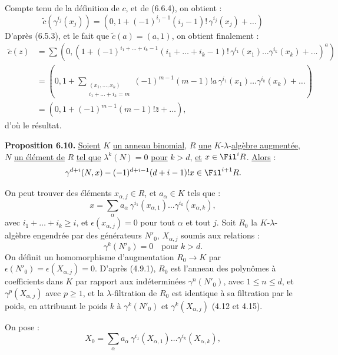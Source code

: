 
Compte tenu de la définition de \(c\), et de (6.6.4), on obtient :
\[
  \widetilde c(\gamma^{i_j}(x_j))
  =
  \left(0,1+(-1)^{i_j-1}(i_j-1)!\,\gamma^{i_j}(x_j)+\ldots\right)
\]
D'après (6.5.3), et le fait que \(\widetilde c(a)=(a,1)\), on obtient finalement :
\[
\begin{aligned}
\widetilde c(z)
&=\sum
\left(0,\left(1+
(-1)^{i_1+\ldots+i_k-1}
(i_1+\ldots+i_k-1)!
\,\gamma^{i_1}(x_1)\ldots\gamma^{i_k}(x_k)
+\ldots\right)^a\right)\\
&=
\left(0,1+
\sum_{\substack{(x_1,\ldots,x_k)\\ i_1+\ldots+i_k=m}}
(-1)^{m-1}(m-1)!a\,\gamma^{i_1}(x_1)\ldots\gamma^{i_k}(x_k)
+\ldots\right)\\
&=
(0,1+(-1)^{m-1}(m-1)!\bar z+\ldots),
\end{aligned}
\]
d'où le résultat.

\textbf{Proposition 6.10.} \uline{Soient} \(K\) \uline{un anneau binomial}, \(R\) \uline{une} \(K\)-\(\lambda\)-\uline{algèbre augmentée}, \(N\) \uline{un élément de} \(R\) \uline{tel que} \(\lambda^k(N)=0\) \uline{pour} \(k>d\), \uline{et} \(x\in\Fil^iR\). \uline{Alors} :
\[
  \gamma^{d+i}(N,x)-(-1)^{d+i-1}(d+i-1)!x\in\Fil^{i+1}R.
\]

On peut trouver des éléments \(x_{\alpha,j}\in R\), et \(a_\alpha\in K\) tels que :
\[
  x=\sum_\alpha a_\alpha\,
       \gamma^{i_1}(x_{\alpha,1})\ldots
       \gamma^{i_k}(x_{\alpha,k}),
\]
avec \(i_1+\ldots+i_k\ge i\), et \(\epsilon(x_{\alpha,j})=0\) pour tout \(\alpha\) et tout \(j\). Soit \(R_0\) la \(K\)-\(\lambda\)-algèbre engendrée par des générateurs \(N'_0\), \(X_{\alpha,j}\) soumis aux relations :
\[
  \gamma^k(N'_0)=0\quad\text{pour }k>d.
\]
On définit un homomorphisme d'augmentation \(R_0\to K\) par \(\epsilon(N'_0)=\epsilon(X_{\alpha,j})=0\). D'après (4.9.1), \(R_0\) est l'anneau des polynômes à coefficients dans \(K\) par rapport aux indéterminées \(\gamma^n(N'_0)\), avec \(1\le n\le d\), et \(\gamma^p(X_{\alpha,j})\) avec \(p\ge1\), et la \(\lambda\)-filtration de \(R_0\) est identique à sa filtration par le poids, en attribuant le poids \(k\) à \(\gamma^k(N'_0)\) et \(\gamma^k(X_{\alpha,j})\) (4.12 et 4.15).

On pose :
\[
  X_0=\sum_\alpha a_\alpha\,
       \gamma^{i_1}(X_{\alpha,1})\ldots
       \gamma^{i_k}(X_{\alpha,k}),
\]
